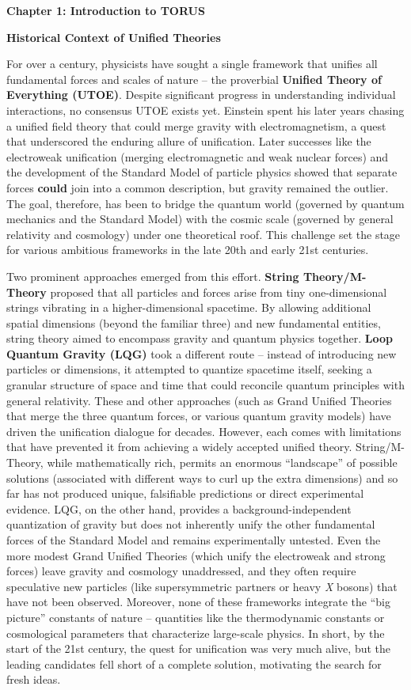 \documentclass[
]{article}
\author{}
\date{}
\begin{document}
\textbf{Chapter 1: Introduction to TORUS}

\textbf{Historical Context of Unified Theories}

For over a century, physicists have sought a single framework that
unifies all fundamental forces and scales of nature -- the proverbial
\textbf{Unified Theory of Everything (UTOE)}. Despite significant
progress in understanding individual interactions, no consensus UTOE
exists yet. Einstein spent his later years chasing a unified field
theory that could merge gravity with electromagnetism, a quest that
underscored the enduring allure of unification. Later successes like the
electroweak unification (merging electromagnetic and weak nuclear
forces) and the development of the Standard Model of particle physics
showed that separate forces \textbf{could} join into a common
description, but gravity remained the outlier. The goal, therefore, has
been to bridge the quantum world (governed by quantum mechanics and the
Standard Model) with the cosmic scale (governed by general relativity
and cosmology) under one theoretical roof. This challenge set the stage
for various ambitious frameworks in the late 20th and early 21st
centuries.

Two prominent approaches emerged from this effort. \textbf{String
Theory/M-Theory} proposed that all particles and forces arise from tiny
one-dimensional strings vibrating in a higher-dimensional spacetime. By
allowing additional spatial dimensions (beyond the familiar three) and
new fundamental entities, string theory aimed to encompass gravity and
quantum physics together. \textbf{Loop Quantum Gravity (LQG)} took a
different route -- instead of introducing new particles or dimensions,
it attempted to quantize spacetime itself, seeking a granular structure
of space and time that could reconcile quantum principles with general
relativity. These and other approaches (such as Grand Unified Theories
that merge the three quantum forces, or various quantum gravity models)
have driven the unification dialogue for decades. However, each comes
with limitations that have prevented it from achieving a widely accepted
unified theory. String/M-Theory, while mathematically rich, permits an
enormous ``landscape'' of possible solutions (associated with different
ways to curl up the extra dimensions) and so far has not produced
unique, falsifiable predictions or direct experimental evidence. LQG, on
the other hand, provides a background-independent quantization of
gravity but does not inherently unify the other fundamental forces of
the Standard Model and remains experimentally untested. Even the more
modest Grand Unified Theories (which unify the electroweak and strong
forces) leave gravity and cosmology unaddressed, and they often require
speculative new particles (like supersymmetric partners or heavy
\emph{X} bosons) that have not been observed. Moreover, none of these
frameworks integrate the ``big picture'' constants of nature --
quantities like the thermodynamic constants or cosmological parameters
that characterize large-scale physics. In short, by the start of the
21st century, the quest for unification was very much alive, but the
leading candidates fell short of a complete solution, motivating the
search for fresh ideas.
\end{document}
